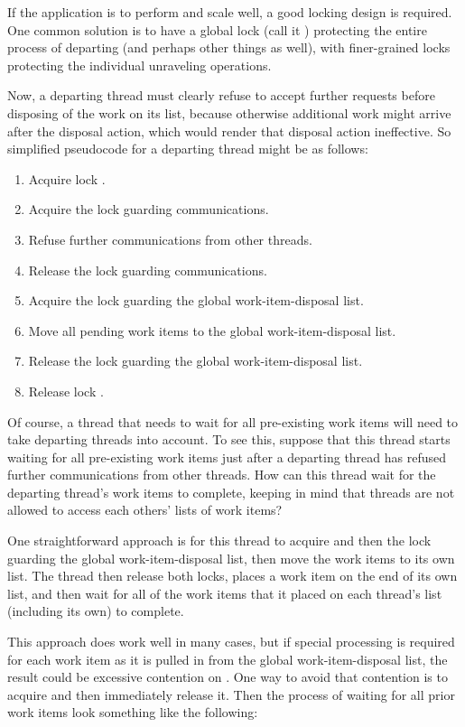 {	If the application is to perform and scale well, a good locking
	design is required.
	One common solution is to have a global lock (call it )
	protecting the entire
	process of departing (and perhaps other things as well),
	with finer-grained locks protecting the
	individual unraveling operations.

	Now, a departing thread must clearly refuse to accept further
	requests before disposing of the work on its list, because
	otherwise additional work might arrive after the disposal action,
	which would render that disposal action ineffective.
	So simplified pseudocode for a departing thread might be as follows:

	\begin{enumerate}
	\item	Acquire lock .
	\item	Acquire the lock guarding communications.
	\item	Refuse further communications from other threads.
	\item	Release the lock guarding communications.
	\item	Acquire the lock guarding the global work-item-disposal list.
	\item	Move all pending work items to the global
		work-item-disposal list.
	\item	Release the lock guarding the global work-item-disposal list.
	\item	Release lock .
	\end{enumerate}

	Of course, a thread that needs to wait for all pre-existing work
	items will need to take departing threads into account.
	To see this, suppose that this thread starts waiting for all
	pre-existing work items just after a departing thread has refused
	further communications from other threads.
	How can this thread wait for the departing thread's work items
	to complete, keeping in mind that threads are not allowed to
	access each others' lists of work items?

	One straightforward approach is for this thread to acquire 
	and then the lock guarding the global work-item-disposal list, then
	move the work items to its own list.
	The thread then release both locks,
	places a work item on the end of its own list,
	and then wait for all of the work items that it placed on each thread's
	list (including its own) to complete.

	This approach does work well in many cases, but if special
	processing is required for each work item as it is pulled in
	from the global work-item-disposal list, the result could be
	excessive contention on .
	One way to avoid that contention is to acquire  and then
	immediately release it.
	Then the process of waiting for all prior work items look
	something like the following:

}
